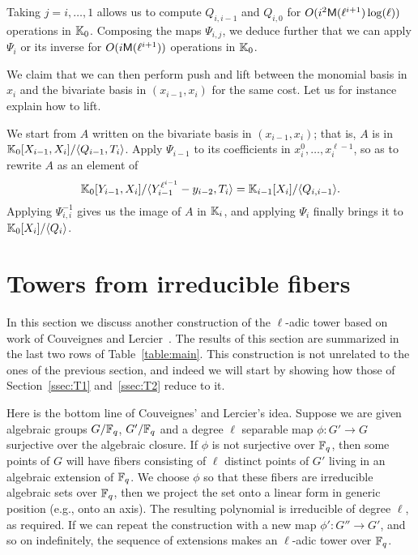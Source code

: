\documentclass{sig-alternate}
\begin{document}
\medskip

Taking $j=i,\dots,1$ allows us to compute $Q_{i,i-1}$ and $Q_{i,0}$
for $O(i^2\mathsf{M}(\ell^{i+1})\log(\ell))$ operations in $\mathbb{K}_0$. Composing
the maps $\Psi_{i,j}$, we deduce further that we can apply $\Psi_i$ or
its inverse for $O(i\mathsf{M}(\ell^{i+1}))$ operations in $\mathbb{K}_0$.  

We claim that we can then perform push and lift between the monomial
basis in $x_i$ and the bivariate basis in $(x_{i-1},x_i)$ for the same
cost. Let us for instance explain how to lift.

We start from $A$ written on the bivariate basis in $(x_{i-1},x_i)$;
that is, $A$ is in $\mathbb{K}_0[X_{i-1},X_i]/\langle Q_{i-1},
T_{i}\rangle$. Apply $\Psi_{i-1}$ to its coefficients in
$x_i^0,\dots,x_i^{\ell-1}$, so as to rewrite $A$ as an element of
$$\mathbb{K}_0[Y_{i-1},X_i]/\langle Y_{i-1}^{\ell^{i-1}}-y_{i-2},
T_{i}\rangle = \mathbb{K}_{i-1}[X_i]/\langle Q_{i,i-1} \rangle.$$ Applying
$\Psi_{i,i}^{-1}$ gives us the image of $A$ in $\mathbb{K}_i$, and applying
$\Psi_i$ finally brings it to $\mathbb{K}_0[X_i]/\langle Q_{i}\rangle$.



\section{Towers from irreducible fibers}
\label{sec:fibers}

In this section we discuss another construction of the $\ell$-adic
tower based on work of Couveignes and
Lercier~\cite{couveignes+lercier11}. The results of this section are
summarized in the last two rows of Table~\ref{table:main}. This
construction is not unrelated to the ones of the previous section, and
indeed we will start by showing how those of Section~\ref{ssec:T1}
and~\ref{ssec:T2} reduce to it.

Here is the bottom line of Couveignes' and Lercier's idea. Suppose we
are given algebraic groups $G/\mathbb{F}_q$, $G'/\mathbb{F}_q$ and a degree $\ell$ separable map
$\phi:G'\to G$ surjective over the algebraic closure. If $\phi$ is not
surjective over $\mathbb{F}_q$, then some points of $G$ will have fibers
consisting of $\ell$ distinct points of $G'$ living in an algebraic
extension of $\mathbb{F}_q$. We choose $\phi$ so that these fibers are
irreducible algebraic sets over $\mathbb{F}_q$, then we project the set onto a
linear form in generic position (e.g., onto an axis). The resulting
polynomial is irreducible of degree $\ell$, as required. If we can
repeat the construction with a new map $\phi':G''\to G'$, and so on
indefinitely, the sequence of extensions makes an $\ell$-adic tower
over $\mathbb{F}_q$.
\end{document}
